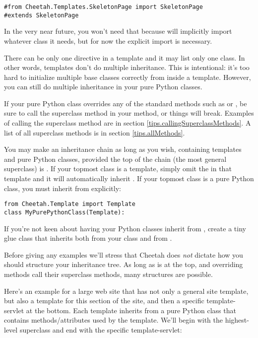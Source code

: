 \begin{verbatim}
#from Cheetah.Templates.SkeletonPage import SkeletonPage
#extends SkeletonPage
\end{verbatim}

In the very near future, you won't need that 
because  will implicitly import whatever 
class it needs, but for now the explicit import is necessary.

There can be only one  directive in a template and it
may list only one class.  In other words, templates don't do multiple
inheritance.  This is intentional: it's too hard to initialize multiple
base classes correctly from inside a template.  However, you can still do
multiple inheritance in your pure Python classes.

If your pure Python class overrides any of the standard 
methods such as  or , be sure to call
the superclass method in your method, or things will break.  Examples of calling
the superclass method are in section \ref{tips.callingSuperclassMethods}.
A list of all superclass methods is in section 
\ref{tips.allMethods}.

You may make an inheritance chain as long as you wish, containing templates and
pure Python classes, provided the top of the chain (the most general
superclass) is .  If your topmost class is a template, simply
omit the  in that template and it will automatically inherit
.  If your topmost class is a pure Python class, you must
inherit from  explicitly:
\begin{verbatim}
from Cheetah.Template import Template
class MyPurePythonClass(Template):
\end{verbatim}

If you're not keen about having your Python classes inherit from
, create a tiny glue class that inherits both from your
class and from .

Before giving any examples we'll stress that Cheetah does {\em not}
dictate how you should structure your inheritance tree.  As long as
 is at the top, and overriding methods call their
superclass methods, many structures are possible.

Here's an example for a large web site that has not only a general site
template, but also a template for this section of the site, and then a
specific template-servlet at the bottom.  Each template inherits from a
pure Python class that contains methods/attributes used by the template.
We'll begin with the highest-level superclass and end with the specific
template-servlet:

